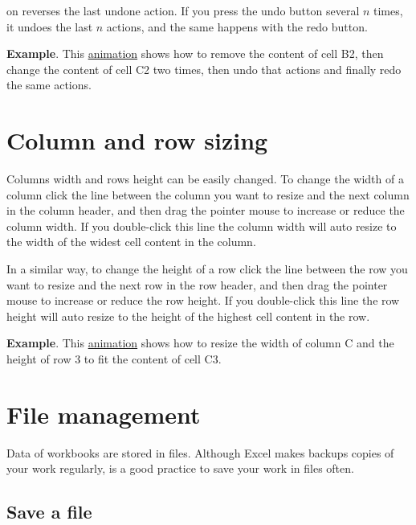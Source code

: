 on reverses the last undone action. If you press the undo button several $n$ times, it undoes the last $n$ actions, and the same happens with the redo button.

\textbf{Example}.  This \href{http://aprendeconalf.es/office/excel/manual/img/example_undo.gif}{animation} shows how to remove the content of cell B2, then change the content of cell C2 two times, then undo that actions and finally redo the same actions.

\section{Column and row sizing}\hypertarget{column-and-row-sizing}{}\label{column-and-row-sizing}

Columns width and rows height can be easily changed. To change the width of a column click the line between the column you want to resize and the next column in the column header, and then drag the pointer mouse to increase or reduce the column width. If you double-click this line the column width will auto resize to the width of the widest cell content in the column.

In a similar way, to change the height of a row click the line between the row you want to resize and the next row in the row header, and then drag the pointer mouse to increase or reduce the row height. If you double-click this line the row height will auto resize to the height of the highest cell content in the row.

\textbf{Example}.  This \href{http://aprendeconalf.es/office/excel/manual/img/example_row_column_resize.gif}{animation} shows how to resize the width of column C and the height of row 3 to fit the content of cell C3.


\section{File management}\hypertarget{file-management}{}\label{file-management}

Data of workbooks are stored in files. Although Excel makes backups copies of your work regularly, is a good practice to save your work in files often.

\subsection{Save a file}\hypertarget{save-a-file}{}\label{save-a-file}

